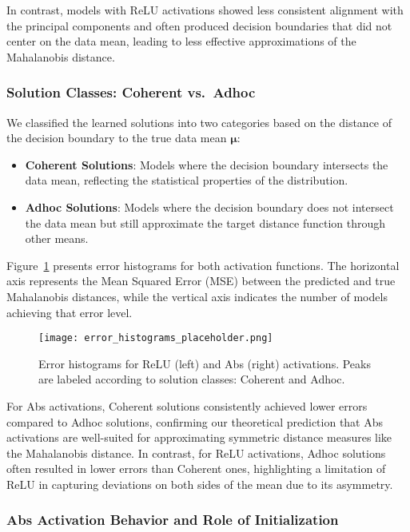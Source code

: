 In contrast, models with ReLU activations showed less consistent alignment with the principal components and often produced decision boundaries that did not center on the data mean, leading to less effective approximations of the Mahalanobis distance.

\subsubsection{Solution Classes: Coherent vs.\ Adhoc}

We classified the learned solutions into two categories based on the distance of the decision boundary to the true data mean $\boldsymbol{\mu}$:

\begin{itemize}
    \item \textbf{Coherent Solutions}: Models where the decision boundary intersects the data mean, reflecting the statistical properties of the distribution.
    \item \textbf{Adhoc Solutions}: Models where the decision boundary does not intersect the data mean but still approximate the target distance function through other means.
\end{itemize}

Figure~\ref{fig:error_histograms} presents error histograms for both activation functions. The horizontal axis represents the Mean Squared Error (MSE) between the predicted and true Mahalanobis distances, while the vertical axis indicates the number of models achieving that error level.

\begin{figure}[h]
\centering
\texttt{[image: error\_histograms\_placeholder.png]}
\caption{Error histograms for ReLU (left) and Abs (right) activations. Peaks are labeled according to solution classes: Coherent and Adhoc.}
\label{fig:error_histograms}
\end{figure}

For Abs activations, Coherent solutions consistently achieved lower errors compared to Adhoc solutions, confirming our theoretical prediction that Abs activations are well-suited for approximating symmetric distance measures like the Mahalanobis distance. In contrast, for ReLU activations, Adhoc solutions often resulted in lower errors than Coherent ones, highlighting a limitation of ReLU in capturing deviations on both sides of the mean due to its asymmetry.

\subsubsection{Abs Activation Behavior and Role of Initialization}

